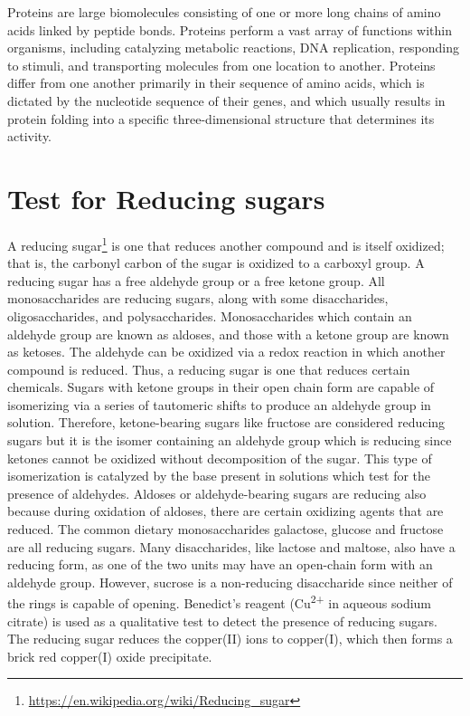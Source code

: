 \documentclass[]{book}
\let\rmarkdownfootnote\footnote%
\def\footnote{\protect\rmarkdownfootnote}
\renewcommand{\href}[2]{#2\footnote{\url{#1}}}
\theoremstyle{definition}
\theoremstyle{definition}
\theoremstyle{definition}
\theoremstyle{remark}
\begin{document}
Proteins are large biomolecules consisting of one or more long chains of
amino acids linked by peptide bonds. Proteins perform a vast array of
functions within organisms, including catalyzing metabolic reactions,
DNA replication, responding to stimuli, and transporting molecules from
one location to another. Proteins differ from one another primarily in
their sequence of amino acids, which is dictated by the nucleotide
sequence of their genes, and which usually results in protein folding
into a specific three-dimensional structure that determines its
activity.

\section{Test for Reducing sugars}\label{test-for-reducing-sugars}

A \href{https://en.wikipedia.org/wiki/Reducing_sugar}{reducing sugar} is
one that reduces another compound and is itself oxidized; that is, the
carbonyl carbon of the sugar is oxidized to a carboxyl group. A reducing
sugar has a free aldehyde group or a free ketone group. All
monosaccharides are reducing sugars, along with some disaccharides,
oligosaccharides, and polysaccharides. Monosaccharides which contain an
aldehyde group are known as aldoses, and those with a ketone group are
known as ketoses. The aldehyde can be oxidized via a redox reaction in
which another compound is reduced. Thus, a reducing sugar is one that
reduces certain chemicals. Sugars with ketone groups in their open chain
form are capable of isomerizing via a series of tautomeric shifts to
produce an aldehyde group in solution. Therefore, ketone-bearing sugars
like fructose are considered reducing sugars but it is the isomer
containing an aldehyde group which is reducing since ketones cannot be
oxidized without decomposition of the sugar. This type of isomerization
is catalyzed by the base present in solutions which test for the
presence of aldehydes. Aldoses or aldehyde-bearing sugars are reducing
also because during oxidation of aldoses, there are certain oxidizing
agents that are reduced. The common dietary monosaccharides galactose,
glucose and fructose are all reducing sugars. Many disaccharides, like
lactose and maltose, also have a reducing form, as one of the two units
may have an open-chain form with an aldehyde group. However, sucrose is
a non-reducing disaccharide since neither of the rings is capable of
opening. Benedict's reagent (Cu\textsuperscript{2+} in aqueous sodium
citrate) is used as a qualitative test to detect the presence of
reducing sugars. The reducing sugar reduces the copper(II) ions to
copper(I), which then forms a brick red copper(I) oxide precipitate.
\end{document}
